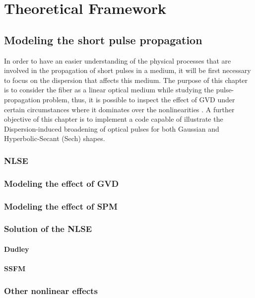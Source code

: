 \chapter{Theoretical Framework}



    \section{Modeling the short  pulse propagation}
    In order to have an easier understanding of the physical processes that are involved in the propagation of short pulses in a medium, it will be first necessary to focus on the dispersion that affects this medium. The purpose of this chapter is to consider the fiber as a linear optical medium while studying the pulse-propagation problem, thus, it is possible to inspect the effect of GVD under certain circumstances where it dominates over the nonlinearities \citep{ AgrawalBook}. A further objective of this chapter is to implement a code capable of illustrate the Dispersion-induced broadening of optical pulses for both Gaussian and Hyperbolic-Secant (Sech) shapes.
    
        \subsection{NLSE}
        
        \subsection{Modeling the effect of GVD}
        \subsection{Modeling the effect of SPM}
        
        \subsection{Solution of the NLSE}
            \subsubsection{Dudley}
            \subsubsection{SSFM}
            
        \subsection{Other nonlinear effects}


